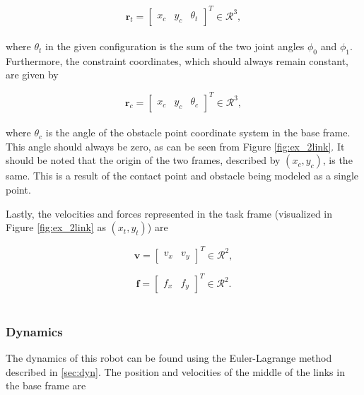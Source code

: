 \begin{equation}
    \mathbf{r}_t = 
    \begin{bmatrix}
        x_c & y_c & \theta_t
    \end{bmatrix}^T \in \mathcal{R}^3,
\end{equation}
\\
where $\theta_t$ in the given configuration is the sum of the two joint angles $\phi_0$ and $\phi_1$. Furthermore, the constraint coordinates, which should always remain constant, are given by

\begin{equation}
    \mathbf{r}_c = 
    \begin{bmatrix}
        x_c & y_c & \theta_c
    \end{bmatrix}^T \in \mathcal{R}^3,
\end{equation}
\\
where $\theta_c$ is the angle of the obstacle point coordinate system in the base frame. This angle should always be zero, as can be seen from Figure \ref{fig:ex_2link}. It should be noted that the origin of the two frames, described by $(x_c, y_c)$, is the same. This is a result of the contact point and obstacle being modeled as a single point.

Lastly, the velocities and forces represented in the task frame (visualized in Figure \ref{fig:ex_2link} as $(x_t, y_t)$) are 

\begin{equation}
    \mathbf{v} =
    \begin{bmatrix}
        v_x & v_y
    \end{bmatrix}^T \in \mathcal{R}^2,
\end{equation}

\begin{equation}
    \mathbf{f} =
    \begin{bmatrix}
        f_x & f_y
    \end{bmatrix}^T \in \mathcal{R}^2.
\end{equation}
\\

\subsubsection{Dynamics}

The dynamics of this robot can be found using the Euler-Lagrange method described in \ref{sec:dyn}.
The position and velocities of the middle of the links in the base frame are

